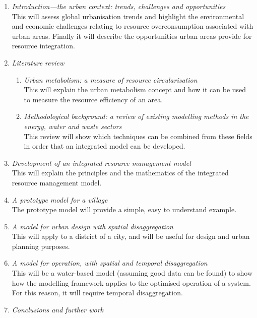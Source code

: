 \begin{enumerate}
	\item \emph{Introduction---the urban context: trends, challenges and opportunities} \\
		This will assess global urbanisation trends and highlight the environmental and economic challenges relating to resource overconsumption associated with urban areas. Finally it will describe the opportunities urban areas provide for resource integration.
	\item \emph{Literature review} \\
		\begin{enumerate}
			\item \emph{Urban metabolism: a measure of resource circularisation} \\
				This will explain the urban metabolism concept and how it can be used to measure the resource efficiency of an area.
			\item \emph{Methodological background: a review of existing modelling methods in the energy, water and waste sectors} \\
				This review will show which techniques can be combined from these fields in order that an integrated model can be developed.
		\end{enumerate}
	\item \emph{Development of an integrated resource management model} \\
		This will explain the principles and the mathematics of the integrated resource management model.
	
	\item \emph{A prototype model for a village} \\
		The prototype model will provide a simple, easy to understand example.
	\item \emph{A model for urban design with spatial disaggregation} \\
		This will apply to a district of a city, and will be useful for design and urban planning purposes.
	\item \emph{A model for operation, with spatial and temporal disaggregation} \\
		This will be a water-based model (assuming good data can be found) to show how the modelling framework applies to the optimised operation of a system. For this reason, it will require temporal disaggregation.
	\item \emph{Conclusions and further work}
\end{enumerate}


